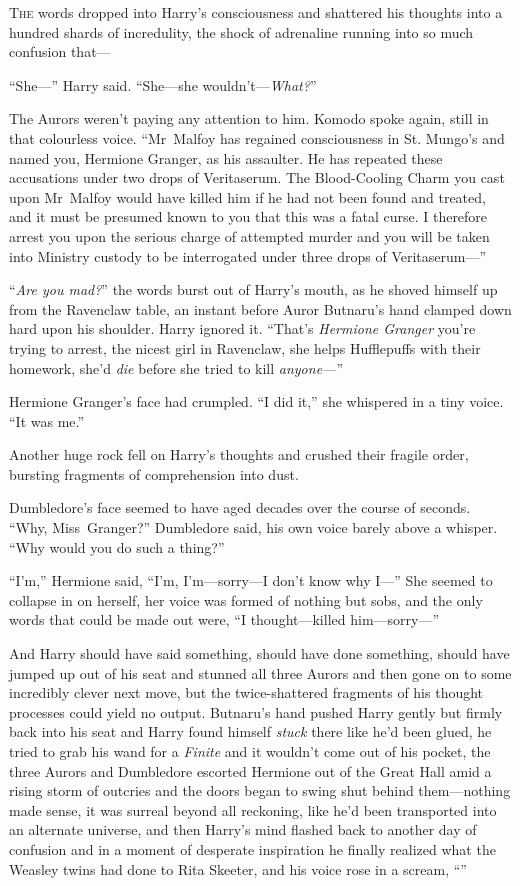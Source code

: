 
\lettrine{T}{he} words dropped into Harry’s consciousness and shattered his thoughts into a hundred shards of incredulity, the shock of adrenaline running into so much confusion that—

“She—” Harry said. “She—she wouldn’t—\emph{What?}”

The Aurors weren’t paying any attention to him. Komodo spoke again, still in that colourless voice. “Mr~Malfoy has regained consciousness in St. Mungo’s and named you, Hermione Granger, as his assaulter. He has repeated these accusations under two drops of Veritaserum. The Blood-Cooling Charm you cast upon Mr~Malfoy would have killed him if he had not been found and treated, and it must be presumed known to you that this was a fatal curse. I therefore arrest you upon the serious charge of attempted murder and you will be taken into Ministry custody to be interrogated under three drops of Veritaserum—”

“\emph{Are you mad?}” the words burst out of Harry’s mouth, as he shoved himself up from the Ravenclaw table, an instant before Auror Butnaru’s hand clamped down hard upon his shoulder. Harry ignored it. “That’s \emph{Hermione Granger} you’re trying to arrest, the nicest girl in Ravenclaw, she helps Hufflepuffs with their homework, she’d \emph{die} before she tried to kill \emph{anyone—}”

Hermione Granger’s face had crumpled. “I did it,” she whispered in a tiny voice. “It was me.”

Another huge rock fell on Harry’s thoughts and crushed their fragile order, bursting fragments of comprehension into dust.

Dumbledore’s face seemed to have aged decades over the course of seconds. “Why, Miss~Granger?” Dumbledore said, his own voice barely above a whisper. “Why would you do such a thing?”

“I’m,” Hermione said, “I’m, I’m—sorry—I don’t know why I—” She seemed to collapse in on herself, her voice was formed of nothing but sobs, and the only words that could be made out were, “I thought—killed him—sorry—”

And Harry should have said something, should have done something, should have jumped up out of his seat and stunned all three Aurors and then gone on to some incredibly clever next move, but the twice-shattered fragments of his thought processes could yield no output. Butnaru’s hand pushed Harry gently but firmly back into his seat and Harry found himself \emph{stuck} there like he’d been glued, he tried to grab his wand for a \emph{Finite} and it wouldn’t come out of his pocket, the three Aurors and Dumbledore escorted Hermione out of the Great Hall amid a rising storm of outcries and the doors began to swing shut behind them—nothing made sense, it was surreal beyond all reckoning, like he’d been transported into an alternate universe, and then Harry’s mind flashed back to another day of confusion and in a moment of desperate inspiration he finally realized what the Weasley twins had done to Rita Skeeter, and his voice rose in a scream, “”


